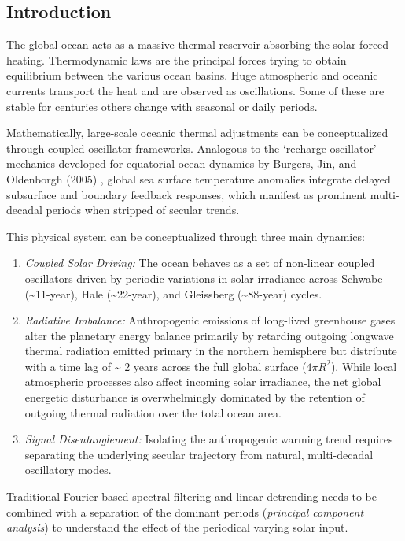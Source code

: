 \documentclass[
  letterpaper,
  DIV=11,
  numbers=noendperiod]{scrartcl}
\providecommand{\tightlist}{%
  \setlength{\itemsep}{0pt}\setlength{\parskip}{0pt}}
\begin{document}
\subsection{Introduction}\label{introduction}

The global ocean acts as a massive thermal reservoir absorbing the solar
forced heating. Thermodynamic laws are the principal forces trying to
obtain equilibrium between the various ocean basins. Huge atmospheric
and oceanic currents transport the heat and are observed as
oscillations. Some of these are stable for centuries others change with
seasonal or daily periods.

Mathematically, large-scale oceanic thermal adjustments can be
conceptualized through coupled-oscillator frameworks. Analogous to the
`recharge oscillator' mechanics developed for equatorial ocean dynamics
by Burgers, Jin, and Oldenborgh (2005) , global sea surface temperature
anomalies integrate delayed subsurface and boundary feedback responses,
which manifest as prominent multi-decadal periods when stripped of
secular trends.

This physical system can be conceptualized through three main dynamics:

\begin{enumerate}
\def\labelenumi{\arabic{enumi}.}
\tightlist
\item
  \emph{Coupled Solar Driving:} The ocean behaves as a set of non-linear
  coupled oscillators driven by periodic variations in solar irradiance
  across Schwabe (\textasciitilde11-year), Hale
  (\textasciitilde22-year), and Gleissberg (\textasciitilde88-year)
  cycles.
\item
  \emph{Radiative Imbalance:} Anthropogenic emissions of long-lived
  greenhouse gases alter the planetary energy balance primarily by
  retarding outgoing longwave thermal radiation emitted primary in the
  northern hemisphere but distribute with a time lag of
  \textasciitilde{} 2 years across the full global surface
  (\(4\pi R^2\)). While local atmospheric processes also affect incoming
  solar irradiance, the net global energetic disturbance is
  overwhelmingly dominated by the retention of outgoing thermal
  radiation over the total ocean area.
\item
  \emph{Signal Disentanglement:} Isolating the anthropogenic warming
  trend requires separating the underlying secular trajectory from
  natural, multi-decadal oscillatory modes.
\end{enumerate}

Traditional Fourier-based spectral filtering and linear detrending needs
to be combined with a separation of the dominant periods
(\emph{principal component analysis}) to understand the effect of the
periodical varying solar input.
\end{document}
